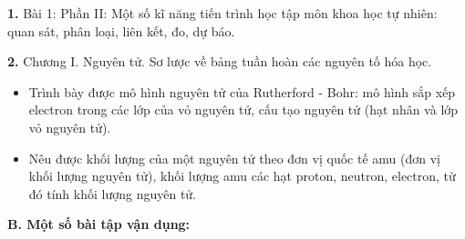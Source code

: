 \documentclass[11pt,a4paper]{article}
\begin{document}
\textbf{1.} Bài 1: Phần II: Một số kĩ năng tiến trình học tập môn khoa học tự nhiên: quan sát, phân loại, liên kết, đo, dự báo.
\par\vspace{1pt}\noindent\dotfill\par\vspace{3pt}\noindent\dotfill\par\vspace{3pt}\noindent\dotfill\par\vspace{3pt}\noindent\dotfill\par\vspace{3pt}\noindent
\textbf{2.} Chương I. Nguyên tử. Sơ lược về bảng tuần hoàn các nguyên tố hóa học.
\begin{itemize}[leftmargin=*,itemsep=1pt]
  \item Trình bày được mô hình nguyên tử của Rutherford - Bohr: mô hình sắp xếp electron trong các lớp của vỏ nguyên tử, cấu tạo nguyên tử (hạt nhân và lớp vỏ nguyên tử).
  \item Nêu được khối lượng của một nguyên tử theo đơn vị quốc tế amu (đơn vị khối lượng nguyên tử), khối lượng amu các hạt proton, neutron, electron, từ đó tính khối lượng nguyên tử.
\end{itemize}
\par\vspace{1pt}\noindent\dotfill\par\vspace{3pt}\noindent\dotfill\par\vspace{3pt}\noindent\dotfill\par\vspace{3pt}\noindent\dotfill\par\vspace{3pt}\noindent\dotfill\par\vspace{3pt}\noindent
\vspace{4pt}
{\color{mySub}\textbf{B. Một số bài tập vận dụng:}}
\end{document}
